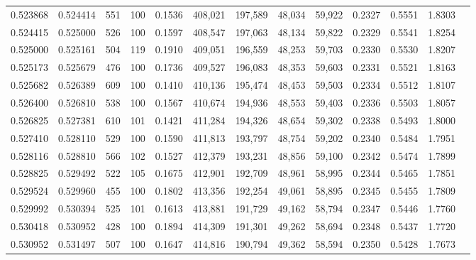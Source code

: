\begin{tabular}{rrrrrrrrrrrrr}
0.523868 & 0.524414 &    551 &   100 &                                     0.1536 & 408,021 & 197,589 &  48,034 &  59,922 & 0.2327 & 0.5551 & 1.8303 \\
0.524415 & 0.525000 &    526 &   100 &                                     0.1597 & 408,547 & 197,063 &  48,134 &  59,822 & 0.2329 & 0.5541 & 1.8254 \\
0.525000 & 0.525161 &    504 &   119 &                                     0.1910 & 409,051 & 196,559 &  48,253 &  59,703 & 0.2330 & 0.5530 & 1.8207 \\
0.525173 & 0.525679 &    476 &   100 &                                     0.1736 & 409,527 & 196,083 &  48,353 &  59,603 & 0.2331 & 0.5521 & 1.8163 \\
0.525682 & 0.526389 &    609 &   100 &                                     0.1410 & 410,136 & 195,474 &  48,453 &  59,503 & 0.2334 & 0.5512 & 1.8107 \\
0.526400 & 0.526810 &    538 &   100 &                                     0.1567 & 410,674 & 194,936 &  48,553 &  59,403 & 0.2336 & 0.5503 & 1.8057 \\
0.526825 & 0.527381 &    610 &   101 &                                     0.1421 & 411,284 & 194,326 &  48,654 &  59,302 & 0.2338 & 0.5493 & 1.8000 \\
0.527410 & 0.528110 &    529 &   100 &                                     0.1590 & 411,813 & 193,797 &  48,754 &  59,202 & 0.2340 & 0.5484 & 1.7951 \\
0.528116 & 0.528810 &    566 &   102 &                                     0.1527 & 412,379 & 193,231 &  48,856 &  59,100 & 0.2342 & 0.5474 & 1.7899 \\
0.528825 & 0.529492 &    522 &   105 &                                     0.1675 & 412,901 & 192,709 &  48,961 &  58,995 & 0.2344 & 0.5465 & 1.7851 \\
0.529524 & 0.529960 &    455 &   100 &                                     0.1802 & 413,356 & 192,254 &  49,061 &  58,895 & 0.2345 & 0.5455 & 1.7809 \\
0.529992 & 0.530394 &    525 &   101 &                                     0.1613 & 413,881 & 191,729 &  49,162 &  58,794 & 0.2347 & 0.5446 & 1.7760 \\
0.530418 & 0.530952 &    428 &   100 &                                     0.1894 & 414,309 & 191,301 &  49,262 &  58,694 & 0.2348 & 0.5437 & 1.7720 \\
0.530952 & 0.531497 &    507 &   100 &                                     0.1647 & 414,816 & 190,794 &  49,362 &  58,594 & 0.2350 & 0.5428 & 1.7673 \\

\end{tabular}
